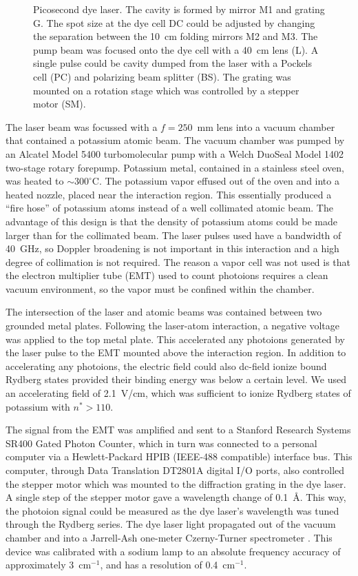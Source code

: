 \begin{figure}[tbp]
\bigskip
{}
{Picosecond dye laser.  The cavity is formed by mirror M1 and grating G.  The
spot size at the dye cell DC could be adjusted by changing the separation
between the 10~cm folding mirrors M2 and M3.  The pump beam was focused onto
the dye cell with a 40~cm lens (L).  A single pulse could be cavity dumped from
the laser with a Pockels cell (PC) and polarizing beam splitter (BS). The
grating was mounted on a rotation stage which was controlled by a stepper motor
(SM).
\label{ps_laser}}
\end{figure}

The laser beam was focussed with a $f=250$~mm lens into a vacuum chamber that
contained a potassium atomic beam.  The vacuum chamber was pumped by an
Alcatel Model 5400 turbomolecular pump with a Welch DuoSeal Model 1402
two-stage rotary forepump.  Potassium metal, contained in a stainless steel
oven, was heated to $\sim 300^{\circ}$C.  The potassium vapor effused out
of the oven and into a heated nozzle, placed near the interaction region.  This
essentially produced a ``fire hose'' of potassium atoms instead of a well
collimated atomic beam.  The advantage of this design is that the density of
potassium atoms could be made larger than for the collimated beam.  The laser
pulses used have a bandwidth of 40~GHz, so Doppler broadening is not
important in this interaction and a high degree of collimation is not required. 
The reason a vapor cell was not used is that the electron multiplier tube (EMT)
used to count photoions requires a clean vacuum environment, so the vapor must
be confined within the chamber.

The intersection of the laser and atomic beams was contained between two
grounded metal plates.  Following the laser-atom interaction, a negative
voltage was applied to the top metal plate.  This accelerated any photoions
generated by the laser pulse to the EMT mounted above the interaction
region.  In addition to accelerating any photoions, the electric field could
also dc-field ionize bound Rydberg states provided their binding energy was
below a certain level.  We used an accelerating field of 2.1~V/cm, which was
sufficient to ionize Rydberg states of potassium with $n^* > 110$.

The signal from the EMT was amplified and sent to a Stanford Research
Systems SR400 Gated Photon Counter, which in turn was connected to a personal
computer via a Hewlett-Packard HPIB (IEEE-488 compatible) interface bus.  This
computer, through Data Translation DT2801A digital I/O ports, also controlled
the stepper motor which was mounted to the diffraction grating in the dye
laser.  A single step of the stepper motor gave a wavelength change of
0.1~\AA.  This way, the photoion signal could be measured as the dye laser's
wavelength was tuned through the Rydberg series.  The dye laser light propagated
out of the vacuum chamber and into a Jarrell-Ash one-meter Czerny-Turner
spectrometer \cite{Sawyer_book}.  This device was calibrated with a sodium lamp
to an absolute frequency accuracy of approximately 3~cm$^{-1}$, and has a
resolution of 0.4~cm$^{-1}$.

